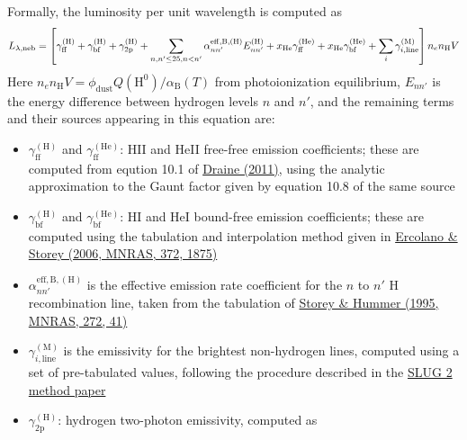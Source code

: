 \documentclass[letterpaper,10pt,english]{sphinxmanual}
\begin{document}
Formally, the luminosity per unit wavelength is computed as
\begin{gather}
\begin{split}L_{\lambda,\mathrm{neb}} = \left[\gamma_{\mathrm{ff}}^{(\mathrm{H})} + \gamma_{\mathrm{bf}}^{(\mathrm{H})} + \gamma_{\mathrm{2p}}^{(\mathrm{H})} + \sum_{n,n' \leq 25, n<n'} \alpha_{nn'}^{\mathrm{eff,B,(H)}} E_{nn'}^{(\mathrm{H})} +  x_{\mathrm{He}} \gamma_{\mathrm{ff}}^{(\mathrm{He})} +  x_{\mathrm{He}} \gamma_{\mathrm{bf}}^{(\mathrm{He})} + \sum_i \gamma_{i,\mathrm{line}}^{(\mathrm{M})}\right] n_e n_{\mathrm{H}}{V}\end{split}\notag
\end{gather}
Here \(n_e n_{\mathrm{H}} V = \phi_{\mathrm{dust}} Q(\mathrm{H}^0)/ \alpha_{\mathrm{B}}(T)\) from photoionization equilibrium, \(E_{nn'}\) is the energy difference between hydrogen levels \(n\) and \(n'\), and the remaining terms and their sources appearing in this equation are:
\begin{itemize}
\item {} 
\(\gamma_{\mathrm{ff}}^{(\mathrm{H})}\) and \(\gamma_{\mathrm{ff}}^{(\mathrm{He})}\): HII and HeII free-free emission coefficients; these are computed from eqution 10.1 of \href{http://adsabs.harvard.edu/abs/2011piim.book.....D}{Draine (2011)}, using the analytic approximation to the Gaunt factor given by equation 10.8 of the same source

\item {} 
\(\gamma_{\mathrm{bf}}^{(\mathrm{H})}\) and \(\gamma_{\mathrm{bf}}^{(\mathrm{He})}\): HI and HeI bound-free emission coefficients; these are computed using the tabulation and interpolation method given in \href{http://adsabs.harvard.edu/abs/2006MNRAS.372.1875E}{Ercolano \& Storey (2006, MNRAS, 372, 1875)}

\item {} 
\(\alpha_{nn'}^{\mathrm{eff,B,(H)}}\) is the effective emission rate coefficient for the \(n\) to \(n'\) H recombination line, taken from the tabulation of \href{http://adsabs.harvard.edu/abs/1995MNRAS.272...41S}{Storey \& Hummer (1995, MNRAS, 272, 41)}

\item {} 
\(\gamma_{i,\mathrm{line}}^{(\mathrm{M})}\) is the emissivity for the brightest non-hydrogen lines, computed using a set of pre-tabulated values, following the procedure described in the \href{http://adsabs.harvard.edu/abs/2015arXiv150205408K}{SLUG 2 method paper}

\item {} 
\(\gamma_{\mathrm{2p}}^{(\mathrm{H})}\): hydrogen two-photon emissivity, computed as

\end{itemize}
\end{document}
